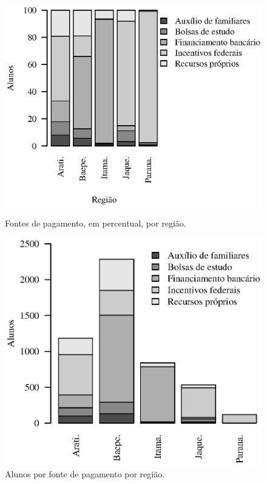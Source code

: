 \documentclass[10pt,a4paper,oneside]{article}
\begin{document}
\begin{figure}[h]
\begin{minipage}{0.49\textwidth}
	\includegraphics[width=\linewidth]{plots/stacked100_pagamento_por_regiao.eps}
	\caption{Fontes de pagamento, em percentual, por região.}
	\label{figure: fonte de pagemento}
\end{minipage}
\begin{minipage}{0.49\textwidth}
	\includegraphics[width=\linewidth]{plots/stacked_pagamento_por_regiao.eps}
	\caption{Alunos por fonte de pagamento por região.}
	\label{fig:fonte de pagamento absoluto}
\end{minipage}
\end{figure}
\end{document}
